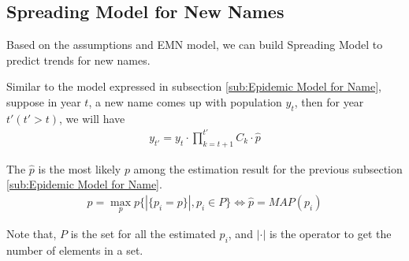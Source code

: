 \documentclass[journal]{IEEEtran}
\begin{document}

\subsection{Spreading Model for New Names} %
\label{sub:spreading_model_for_new_names}
Based on the assumptions and EMN model, we can build Spreading Model to predict trends for new names.

Similar to the model expressed in subsection \ref{sub:Epidemic Model for Name}, suppose in year $t$, a new name comes up with population $y_{t}$, then for year $t' (t' > t)$, we will have
\begin{align}
	y_{t'} = y_{t} \cdot \prod_{k = t + 1}^{t'} C_k \cdot \hat{p}
\end{align}

The $\hat{p}$ is the most likely $p$ among the estimation result for the previous subsection \ref{sub:Epidemic Model for Name}. 
\begin{align}
		\hat{p} = \max_p p\{ |\{p_i = p\}|, p_i \in P\} \label{ep:p_hat} \Leftrightarrow \hat{p} = MAP(p_i)
\end{align}

Note that, $P$ is the set for all the estimated $p_i$, and $|\cdot|$ is the operator to get the number of elements in a set.

\end{document}
